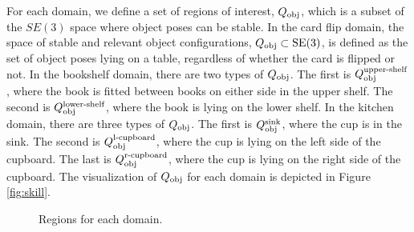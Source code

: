 For each domain, we define a set of regions of interest, $Q_\text{obj}$, which is a subset of the $SE(3)$ space where object poses can be stable. In the card flip domain, the space of stable and relevant object configurations, $Q_\text{obj} \subset \text{SE(3)}$, is defined as the set of object poses lying on a table, regardless of whether the card is flipped or not. In the bookshelf domain, there are two types of $Q_\text{obj}$. The first is $Q_\text{obj}^\text{upper-shelf}$, where the book is fitted between books on either side in the upper shelf. The second is $Q_\text{obj}^\text{lower-shelf}$, where the book is lying on the lower shelf. In the kitchen domain, there are three types of $Q_\text{obj}$. The first is $Q_\text{obj}^\text{sink}$, where the cup is in the sink. The second is $Q_\text{obj}^\text{l-cupboard}$, where the cup is lying on the left side of the cupboard. The last is $Q_\text{obj}^\text{r-cupboard}$, where the cup is lying on the right side of the cupboard. The visualization of $Q_\text{obj}$ for each domain is depicted in Figure \ref{fig:skill}.

\begin{figure*}[h]
\centering
{}
\caption{Regions for each domain.}\label{fig:region}
\end{figure*}
